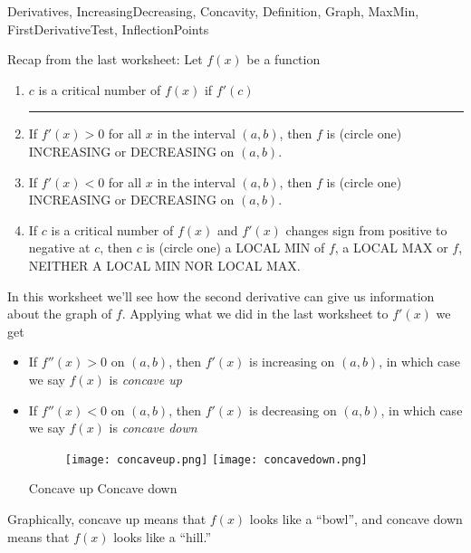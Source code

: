 \begin{tagblock}{Derivatives, IncreasingDecreasing, Concavity, Definition, Graph, MaxMin, FirstDerivativeTest, InflectionPoints}
\begin{question}

Recap from the last worksheet:  Let $f(x)$ be a function 
\begin{enumerate}
\item $c$ is a critical number of $f(x)$ if $f '(c)$  \rule{8cm}{0.1mm}

\bigskip
\item If $f '(x) >0$ for all $x$ in the interval $(a,b)$, then $f$ is (circle one) INCREASING  or DECREASING on $(a,b)$.  

\bigskip
\item If $f '(x) <0$ for all $x$ in the interval $(a,b)$, then $f$ is (circle one) INCREASING  or DECREASING on $(a,b)$.  

\bigskip
\item If $c$ is a critical number of $f(x)$  and $f'(x)$ changes sign from positive to negative at $c$, then $c$ is (circle one) a LOCAL MIN of $f$, a LOCAL MAX or $f$, NEITHER A LOCAL MIN NOR LOCAL MAX.

\end{enumerate}


In this worksheet we'll see how the second derivative can give us information about the graph of $f$.  Applying what we did in the last worksheet to $f '(x)$ we get

\begin{itemize}
\item If $f''(x) >0$ on $(a,b)$, then $f'(x)$ is increasing on $(a,b)$, in which case we say $f(x)$ is \emph{concave up}


\item If $f''(x) <0$ on $(a,b)$, then $f'(x)$ is decreasing on $(a,b)$, in which case we say $f(x)$ is \emph{concave down}
\begin{figure}[h]
\centering
\texttt{[image: concaveup.png]}  \hspace{1in}
\texttt{[image: concavedown.png]} 
\end{figure}

\centering Concave up \hspace{1in} Concave down

\end{itemize}

Graphically, concave up means that $f(x)$ looks like a ``bowl'', and concave down means that $f(x)$ looks like a ``hill.''


\end{question}
\end{tagblock}

